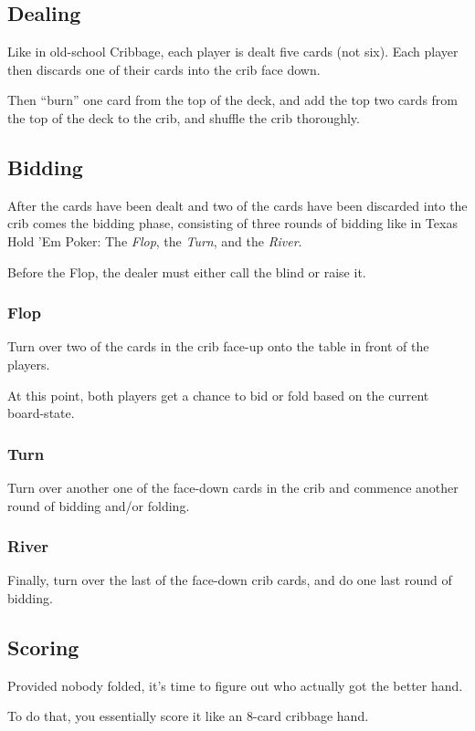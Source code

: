 \documentclass{article}
\begin{document}
\subsection{Dealing}
Like in old-school Cribbage, each player is dealt five cards (not six). 
Each player then discards one of their cards into the crib face down.

Then ``burn'' one card from the top of the deck, and add the top two cards from the top of the deck to the crib, and shuffle the crib thoroughly.

\subsection{Bidding}

After the cards have been dealt and two of the cards have been discarded into the crib comes the bidding phase, consisting of three rounds of bidding like in Texas Hold 'Em Poker: The \textit{Flop}, the \textit{Turn}, and the \textit{River}.

Before the Flop, the dealer must either call the blind or raise it.

\subsubsection{Flop}
Turn over two of the cards in the crib face-up onto the table in front of the players.

At this point, both players get a chance to bid or fold based on the current board-state.

\subsubsection{Turn}
Turn over another one of the face-down cards in the crib and commence another round of bidding and/or folding.

\subsubsection{River}
Finally, turn over the last of the face-down crib cards, and do one last round of bidding.

\subsection{Scoring}
Provided nobody folded, it's time to figure out who actually got the better hand.

To do that, you essentially score it like an 8-card cribbage hand.
\end{document}
